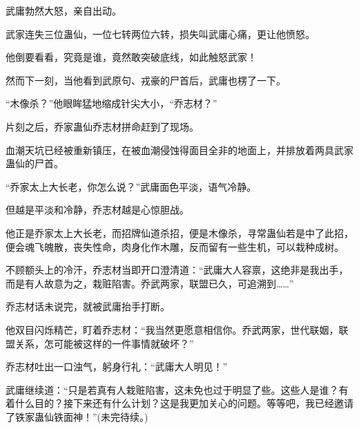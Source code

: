 \begin{this_body}
武庸勃然大怒，亲自出动。

武家连失三位蛊仙，一位七转两位六转，损失叫武庸心痛，更让他愤怒。

他倒要看看，究竟是谁，竟然敢突破底线，如此触怒武家！

然而下一刻，当他看到武原句、戎豪的尸首后，武庸也楞了一下。

“木像杀？”他眼眸猛地缩成针尖大小，“乔志材？”

片刻之后，乔家蛊仙乔志材拼命赶到了现场。

血潮天坑已经被重新镇压，在被血潮侵蚀得面目全非的地面上，并排放着两具武家蛊仙的尸首。

“乔家太上大长老，你怎么说？”武庸面色平淡，语气冷静。

但越是平淡和冷静，乔志材越是心惊胆战。

他正是乔家太上大长老，而招牌仙道杀招，便是木像杀，寻常蛊仙若是中了此招，便会魂飞魄散，丧失性命，肉身化作木雕，反而留有一些生机，可以栽种成树。

不顾额头上的冷汗，乔志材当即开口澄清道：“武庸大人容禀，这绝非是我出手，而是有人故意为之，栽赃陷害。乔武两家，联盟已久，可追溯到……”

乔志材话未说完，就被武庸抬手打断。

他双目闪烁精芒，盯着乔志材：“我当然更愿意相信你。乔武两家，世代联姻，联盟关系，怎可能被这样的一件事情就破坏？”

乔志材吐出一口浊气，躬身行礼：“武庸大人明见！”

武庸继续道：“只是若真有人栽赃陷害，这未免也过于明显了些。这些人是谁？有着什么目的？接下来还有什么计划？这是我更加关心的问题。等等吧，我已经邀请了铁家蛊仙铁面神！”(未完待续。)

\end{this_body}

